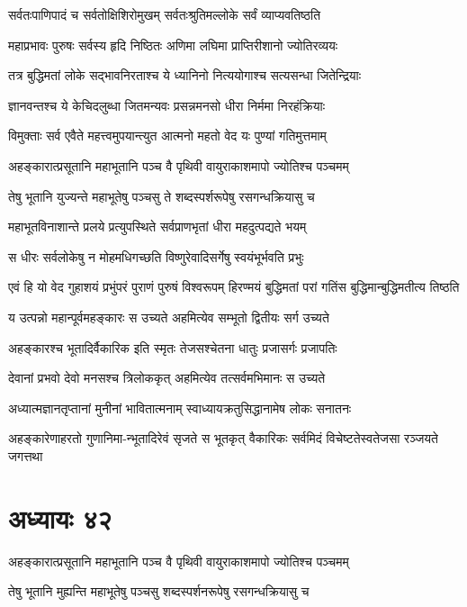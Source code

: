 \twolineshloka
{सर्वतःपाणिपादं च सर्वतोक्षिशिरोमुखम्}
{सर्वतःश्रुतिमल्लोके सर्वं व्याप्यवतिष्ठति}


\twolineshloka
{महाप्रभावः पुरुषः सर्वस्य हृदि निष्ठितः}
{अणिमा लघिमा प्राप्तिरीशानो ज्योतिरव्ययः}


\twolineshloka
{तत्र बुद्धिमतां लोके सद्भावनिरताश्च ये}
{ध्यानिनो नित्ययोगाश्च सत्यसन्धा जितेन्द्रियाः}


\twolineshloka
{ज्ञानवन्तश्च ये केचिदलुब्धा जितमन्यवः}
{प्रसन्नमनसो धीरा निर्ममा निरहंक्रियाः}


\twolineshloka
{विमुक्ताः सर्व एवैते महत्त्वमुपयान्त्युत}
{आत्मनो महतो वेद यः पुण्यां गतिमुत्तमाम्}


\twolineshloka
{अहङ्कारात्प्रसूतानि महाभूतानि पञ्च वै}
{पृथिवी वायुराकाशमापो ज्योतिश्च पञ्चमम्}


\twolineshloka
{तेषु भूतानि युज्यन्ते महाभूतेषु पञ्चसु}
{ते शब्दस्पर्शरूपेषु रसगन्धक्रियासु च}


\twolineshloka
{महाभूतविनाशान्ते प्रलये प्रत्युपस्थिते}
{सर्वप्राणभृतां धीरा महदुत्पद्यते भयम्}


\twolineshloka
{स धीरः सर्वलोकेषु न मोहमधिगच्छति}
{विष्णुरेवादिसर्गेषु स्वयंभूर्भवति प्रभुः}


\twolineshloka
{एवं हि यो वेद गुहाशयं प्रभुंपरं पुराणं पुरुषं विश्वरूपम्}
{हिरण्मयं बुद्धिमतां परां गतिंस बुद्धिमान्बुद्धिमतीत्य तिष्ठति}


\twolineshloka
{य उत्पन्नो महान्पूर्वमहङ्कारः स उच्यते}
{अहमित्येव सम्भूतो द्वितीयः सर्ग उच्यते}


\twolineshloka
{अहङ्कारश्च भूतादिर्वैकारिक इति स्मृतः}
{तेजसश्चेतना धातुः प्रजासर्गः प्रजापतिः}


\twolineshloka
{देवानां प्रभवो देवो मनसश्च त्रिलोककृत्}
{अहमित्येव तत्सर्वमभिमानः स उच्यते}


\twolineshloka
{अध्यात्मज्ञानतृप्तानां मुनीनां भावितात्मनाम्}
{स्वाध्यायक्रतुसिद्धानामेष लोकः सनातनः}


\twolineshloka
{अहङ्कारेणाहरतो गुणानिमा-न्भूतादिरेवं सृजते स भूतकृत्}
{वैकारिकः सर्वमिदं विचेष्टतेस्वतेजसा रञ्जयते जगत्तथा}


\chapter{अध्यायः ४२}
\twolineshloka
{अहङ्कारात्प्रसूतानि महाभूतानि पञ्च वै}
{पृथिवी वायुराकाशमापो ज्योतिश्च पञ्चमम्}


\twolineshloka
{तेषु भूतानि मुह्यन्ति महाभूतेषु पञ्चसु}
{शब्दस्पर्शनरूपेषु रसगन्धक्रियासु च}


